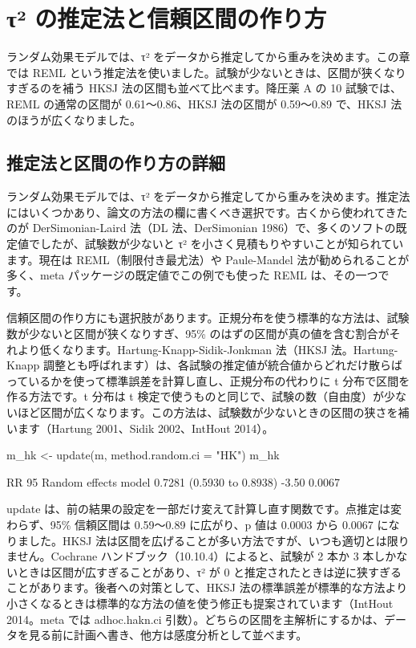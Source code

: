 \section{τ² の推定法と信頼区間の作り方}
\label{sec:05-7}

ランダム効果モデルでは、τ² をデータから推定してから重みを決めます。この章では REML という推定法を使いました。試験が少ないときは、区間が狭くなりすぎるのを補う HKSJ 法の区間も並べて比べます。降圧薬 A の 10 試験では、REML の通常の区間が 0.61〜0.86、HKSJ 法の区間が 0.59〜0.89 で、HKSJ 法のほうが広くなりました。

\subsection{\hatten 推定法と区間の作り方の詳細}
\label{sec:05-7-1}

ランダム効果モデルでは、τ² をデータから推定してから重みを決めます。推定法にはいくつかあり、論文の方法の欄に書くべき選択です。古くから使われてきたのが DerSimonian-Laird 法（DL 法、DerSimonian 1986）で、多くのソフトの既定値でしたが、試験数が少ないと τ² を小さく見積もりやすいことが知られています。現在は REML（制限付き最尤法）や Paule-Mandel 法が勧められることが多く、meta パッケージの既定値でこの例でも使った REML は、その一つです。

信頼区間の作り方にも選択肢があります。正規分布を使う標準的な方法は、試験数が少ないと区間が狭くなりすぎ、95\% のはずの区間が真の値を含む割合がそれより低くなります。Hartung-Knapp-Sidik-Jonkman 法（HKSJ 法。Hartung-Knapp 調整とも呼ばれます）は、各試験の推定値が統合値からどれだけ散らばっているかを使って標準誤差を計算し直し、正規分布の代わりに t 分布で区間を作る方法です。t 分布は t 検定で使うものと同じで、試験の数（自由度）が少ないほど区間が広くなります。この方法は、試験数が少ないときの区間の狭さを補います（Hartung 2001、Sidik 2002、IntHout 2014）。

\begin{rcode}
m_hk <- update(m, method.random.ci = "HK")
m_hk
\end{rcode}

\begin{rout}
                         RR           95%
Random effects model 0.7281 (0.5930 to 0.8938) -3.50   0.0067
\end{rout}

update は、前の結果の設定を一部だけ変えて計算し直す関数です。点推定は変わらず、95\% 信頼区間は 0.59〜0.89 に広がり、p 値は 0.0003 から 0.0067 になりました。HKSJ 法は区間を広げることが多い方法ですが、いつも適切とは限りません。Cochrane ハンドブック（10.10.4）によると、試験が 2 本か 3 本しかないときは区間が広すぎることがあり、τ² が 0 と推定されたときは逆に狭すぎることがあります。後者への対策として、HKSJ 法の標準誤差が標準的な方法より小さくなるときは標準的な方法の値を使う修正も提案されています（IntHout 2014。meta では adhoc.hakn.ci 引数）。どちらの区間を主解析にするかは、データを見る前に計画へ書き、他方は感度分析として並べます。

